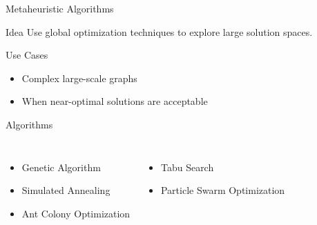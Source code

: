 \documentclass[aspectratio=169]{beamer}
\begin{document}
\begin{frame}{Metaheuristic Algorithms}

\begin{block}{Idea}
Use global optimization techniques to explore large solution spaces.
\end{block}

\vspace{0.2cm}

\begin{exampleblock}{Use Cases}
\begin{itemize}
\item Complex large-scale graphs
\item When near-optimal solutions are acceptable
\end{itemize}
\end{exampleblock}

\vspace{0.2cm}

\begin{alertblock}{Algorithms}

\begin{columns}[T]
\begin{itemize}
\item Genetic Algorithm
\item Simulated Annealing
\item Ant Colony Optimization
\end{itemize}

\begin{itemize}
\item Tabu Search
\item Particle Swarm Optimization
\end{itemize}

\end{columns}

\end{alertblock}

\end{frame}
\end{document}
